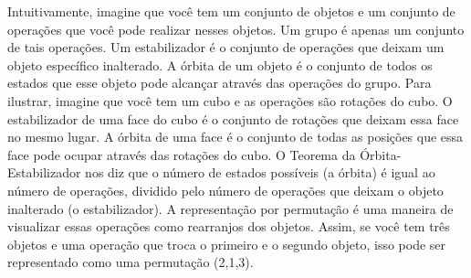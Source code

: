 \documentclass[algebra_notes.tex]{subfiles}
\begin{document}
Intuitivamente, imagine que você tem um conjunto de objetos e um conjunto de operações que você pode realizar nesses objetos. Um grupo é apenas um
conjunto de tais operações. Um estabilizador é o conjunto de operações que deixam um objeto específico inalterado. A órbita de um objeto é o conjunto de
todos os estados que esse objeto pode alcançar através das operações do grupo. Para ilustrar, imagine que você tem um cubo e as operações são rotações do cubo.
O estabilizador de uma face do cubo é o conjunto de rotações que deixam essa face no mesmo lugar.
A órbita de uma face é o conjunto de todas as posições que essa face pode ocupar através das rotações do cubo. O Teorema da Órbita-Estabilizador nos diz que
o número de estados possíveis (a órbita) é igual ao número de operações, dividido pelo número de operações que deixam o objeto inalterado (o estabilizador).
A representação por permutação é uma maneira de visualizar essas operações como rearranjos dos objetos. Assim, se você tem três objetos e uma operação que troca
o primeiro e o segundo objeto, isso pode ser representado como uma permutação (2,1,3).
\end{document}
